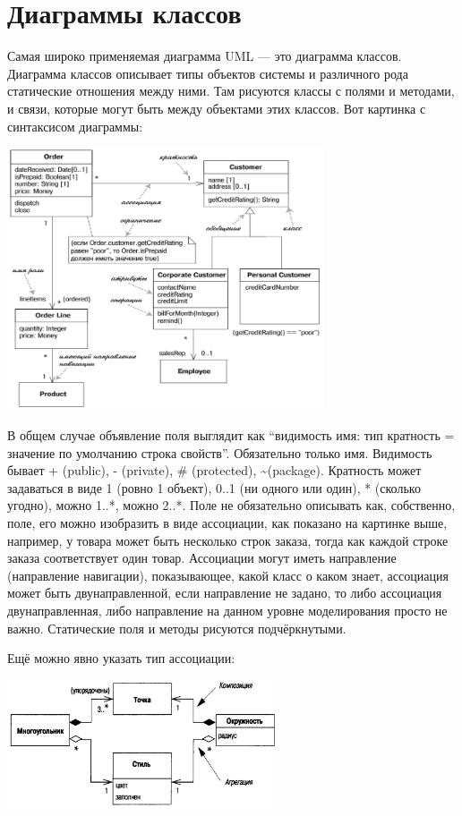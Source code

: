 \documentclass[a5paper]{article}
\begin{document}
\section{Диаграммы классов}

Самая широко применяемая диаграмма UML --- это диаграмма классов. Диаграмма классов описывает типы объектов системы и различного рода статические отношения между ними. Там рисуются классы с полями и методами, и связи, которые могут быть между объектами этих классов. Вот картинка с синтаксисом диаграммы:

\begin{center}
	\includegraphics[width=0.7\textwidth]{umlClassDiagram.png}
\end{center}

В общем случае объявление поля выглядит как ``видимость имя: тип кратность = значение по умолчанию {строка свойств}''. Обязательно только имя. Видимость бывает + (public), - (private), \# (protected), \textasciitilde (package). Кратность может задаваться в виде 1 (ровно 1 объект), 0..1 (ни одного или один), * (сколько угодно), можно 1..*, можно 2..*. Поле не обязательно описывать как, собственно, поле, его можно изобразить в виде ассоциации, как показано на картинке выше, например, у товара может быть несколько строк заказа, тогда как каждой строке заказа соответствует один товар. Ассоциации могут иметь направление (направление навигации), показывающее, какой класс о каком знает, ассоциация может быть двунаправленной, если направление не задано, то либо ассоциация двунаправленная, либо направление на данном уровне моделирования просто не важно. Статические поля и методы рисуются подчёркнутыми.

Ещё можно явно указать тип ассоциации:

\begin{center}
	\includegraphics[width=0.6\textwidth]{associationTypes.png}
\end{center}
\end{document}
